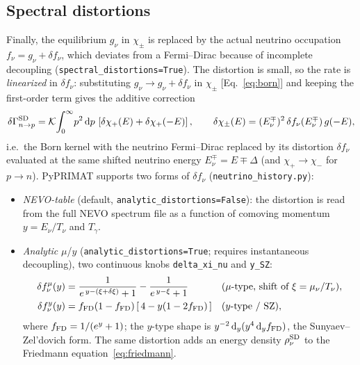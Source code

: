 \documentclass[11pt,a4paper]{article}
\newcommand{\dd}{\mathrm{d}}
\newcommand{\Tg}{T_\gamma}
\newcommand{\code}[1]{\texttt{#1}}
\newcommand{\Gap}{\Delta}
\newcommand{\Kw}{\mathcal{K}}
\begin{document}
\subsection*{Spectral distortions}
Finally, the equilibrium $g_\nu$ in $\chi_\pm$ is replaced by the actual neutrino
occupation $f_\nu=g_\nu+\delta f_\nu$, which deviates from a Fermi--Dirac because
of incomplete decoupling (\code{spectral\_distortions=True}). The distortion is
small, so the rate is \emph{linearized} in $\delta f_\nu$: substituting
$g_\nu\to g_\nu+\delta f_\nu$ in $\chi_\pm$ [Eq.~\eqref{eq:born}] and keeping the
first-order term gives the additive correction
\begin{equation}
  \delta\Gamma^{\rm SD}_{n\to p}=\Kw\!\int_0^\infty\! p^2\,\dd p\,
    \left[\delta\chi_+(E)+\delta\chi_+(-E)\right],
  \qquad
  \delta\chi_\pm(E)=(E_\nu^\mp)^2\,\delta f_\nu(E_\nu^\mp)\,g(-E),
\end{equation}
i.e.\ the Born kernel with the neutrino Fermi--Dirac replaced by its distortion
$\delta f_\nu$ evaluated at the same shifted neutrino energy $E_\nu^\mp=E\mp\Gap$
(and $\chi_+\to\chi_-$ for $p\to n$). PyPRIMAT supports two forms of
$\delta f_\nu$ (\code{neutrino\_history.py}):
\begin{itemize}\itemsep2pt
  \item \emph{NEVO-table} (default, \code{analytic\_distortions=False}): the
    distortion is read from the full NEVO spectrum file as a function of comoving
    momentum $y=E_\nu/T_\nu$ and $\Tg$.
  \item \emph{Analytic} $\mu$/$y$ (\code{analytic\_distortions=True}; requires
    instantaneous decoupling), two continuous knobs \code{delta\_xi\_nu} and
    \code{y\_SZ}:
    \begin{align}
      \delta f^\mu_\nu(y) &= \frac{1}{e^{\,y-(\xi+\delta\xi)}+1}-\frac{1}{e^{\,y-\xi}+1}
        && (\mu\text{-type, shift of }\xi=\mu_\nu/T_\nu),\\
      \delta f^y_\nu(y) &= f_{\rm FD}(1-f_{\rm FD})\,[\,4-y(1-2f_{\rm FD})\,]
        && (y\text{-type / SZ}),
    \end{align}
    where $f_{\rm FD}=1/(e^y+1)$; the $y$-type shape is
    $y^{-2}\,\dd_y(y^4\,\dd_y f_{\rm FD})$, the Sunyaev--Zel'dovich form. The same
    distortion adds an energy density $\rho_\nu^{\rm SD}$ to the Friedmann
    equation~\eqref{eq:friedmann}.
\end{itemize}

\end{document}
